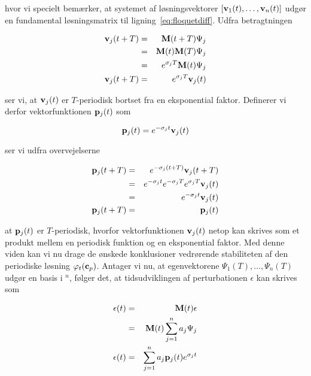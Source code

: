 hvor vi specielt bem{\ae}rker, at systemet af
l{\o}sningsvektorer $\left[{\bf v}_1(t),\ldots,{\bf
v}_n(t)\right]$ udg{\o}r en fundamental l{\o}sningsmatrix
til lig\-ning~\ref{eq:floquetdiff}. Udfra betragtningen

\begin{eqnarray} {\bf v}_j(t+T) & = & {\bf M}(t+T)            \Psi_j
\nonumber\\ & = & {\bf M}(t){\bf M}(T)    \Psi_j
\nonumber\\ & = & e^{\sigma_j T}{\bf M}(t)\Psi_j
\nonumber\\ {\bf v}_j(t+T) & = & e^{\sigma_j T}{\bf v}_j(t)
\end{eqnarray}

ser vi, at ${\bf v}_j(t)$ er $T$-periodisk bortset fra en
eksponential faktor. Definerer vi derfor vektorfunktionen
${\bf p}_j(t)$ som

\begin{equation}
 {\bf p}_j(t) = e^{-\sigma_j t}{\bf v}_j(t)
\end{equation}

ser vi udfra overvejelserne

\begin{eqnarray}
 {\bf p}_j(t+T) & = & e^{-\sigma_j (t+T)}{\bf v}_j(t+T)    \nonumber\\
		& = & e^{-\sigma_j t} e^{-\sigma_j T} 
		      e^{ \sigma_j T}{\bf v}_j(t)          \nonumber\\
		& = & e^{-\sigma_j t}{\bf v}_j(t)          \nonumber\\
 {\bf p}_j(t+T) & = & {\bf p}_j(t)
\end{eqnarray}

at ${\bf p}_j(t)$ er $T$-periodisk, hvorfor
vektorfunktionen ${\bf v}_j(t)$ netop kan skrives som et
produkt mellem en periodisk funktion og en eksponential
faktor. Med denne viden kan vi nu drage de {\o}nskede
konklusioner vedr{\o}rende stabiliteten af den periodiske
l{\o}sning $\varphi_t({\bf c}_p)$. Antager vi nu, at
egenvektorene $\Psi_1(T),\ldots,\Psi_n(T)$ udg{\o}r en
basis i \R$^n$, f{\o}lger det, at tidsudviklingen af
perturbationen $\epsilon$ kan skrives som

\begin{eqnarray}
 \epsilon (t)& = & {\bf M}(t) \epsilon                \nonumber\\
	     & = & {\bf M}(t) \sum_{j=1}^n a_j \Psi_j \nonumber\\
 \epsilon (t)& = & \sum_{j=1}^n a_j {\bf p}_j(t) e^{\sigma_j t}
 \label{eq:PertExpan}
\end{eqnarray}

